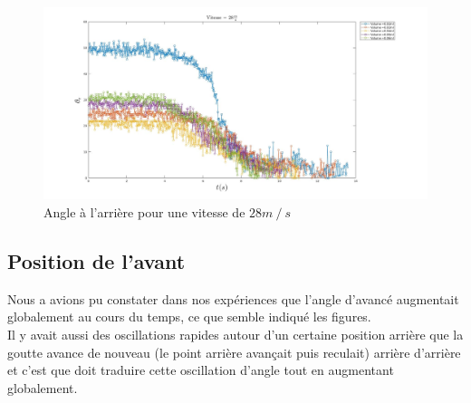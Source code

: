 \documentclass[french]{article}
\begin{document}
\begin{figure}[h]
	\centering
	\includegraphics[width = \linewidth]{./image/v=28or_2.jpg}
	\caption{Angle à l'arrière pour une vitesse de $28m\mathbin{/}s$}
\end{figure}

\newpage
\subsection{Position de l'avant}
Nous a avions pu constater dans nos expériences que l'angle d'avancé augmentait globalement au cours du temps, ce que semble indiqué les figures.\\

Il y avait aussi des oscillations rapides autour d'un certaine position arrière que la goutte avance de nouveau (le point arrière avançait puis reculait) arrière d'arrière et c'est que doit traduire cette oscillation d'angle tout en augmentant globalement.
\end{document}
